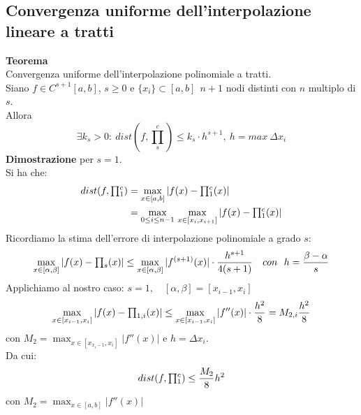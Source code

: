 \subsection{Convergenza uniforme dell'interpolazione lineare a tratti}
\textbf{Teorema}\\
Convergenza uniforme dell'interpolazione polinomiale a tratti.\\
Siano $f\in C^{s+1}[a,b]$, $s\ge0$ e $\{x_i\}\subset[a,b] \ \ n+1$ nodi distinti con $n$ multiplo di $s$.\\
Allora 
\[
\exists k_s > 0: \ dist(f, \prod_s^c) \leq k_s \cdot h^{s+1}, \ h = max \ \Delta x_i
\]
\textbf{Dimostrazione} per $s=1$.\\
Si ha che:
\[ \begin{split}
dist(f, \begin{matrix}\prod\end{matrix}_{1}^{c}) & = \max_{x \in [a,b]} |f(x) - \begin{matrix}\prod\end{matrix}_{1}^{c} (x) | \\
& = \max_{0 \le i \le n-1}\, \max_{x \in [x_i, x_{i+1}]} |f(x) - \begin{matrix}\prod\end{matrix}_{1}^{c} (x) |
\end{split} \]
Ricordiamo la stima dell'errore di interpolazione polinomiale a grado $s$:
\[\max_{x\in [\alpha , \beta]}|f(x) - \inter_{s}^{}(x)| \le \max_{x\in [\alpha , \beta]}|f^{(s+1)}(x)|\cdot\frac{h^{s+1}}{4(s+1)} \quad con \ \ h=\frac{\beta-\alpha}{s} \]
Applichiamo al nostro caso: $s=1, \quad [\alpha,\beta]=[x_{i-1},x_i]$ 
\[\max_{x\in [x_{i-1},x_i]}|f(x) - \begin{matrix}\prod\end{matrix}_{1,i}^{}(x)| \le \max_{x\in [x_{i-1},x_i]}|f''(x)|\cdot\frac{h^2}{8} = M_{2,i} \frac{h^2}{8} \]
con $M_2 = \max_{x\in[x_{x_i-1},x_i]} |f''(x)|$ e $h=\Delta x_i$.\\
Da cui:
\[
dist(f, \begin{matrix}\prod\end{matrix}_{1}^{c}) \le \frac{M_2}{8}h^2 \]
con $M_2 = \max_{x\in[a,b]} |f''(x)|$